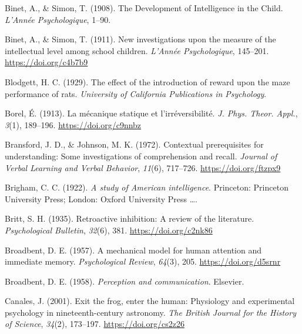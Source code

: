 \documentclass[
  oneside,
  12pt]{crumpbook}
\newlength{\cslhangindent}
\newlength{\cslentryspacingunit} %
\newenvironment{CSLReferences}[2] %
 {%
  \setlength{\parindent}{0pt}
  \ifodd #1
  \let\oldpar\par
  \def\par{\hangindent=\cslhangindent\oldpar}
  \fi
  \setlength{\parskip}{#2\cslentryspacingunit}
 }%
 {}
\begin{document}
\begin{CSLReferences}{1}{0}
\leavevmode{}%
Binet, A., \& Simon, T. (1908). The {Development} of {Intelligence} in the {Child}. \emph{L'Année Psychologique}, 1--90.

\leavevmode{}%
Binet, A., \& Simon, T. (1911). New investigations upon the measure of the intellectual level among school children. \emph{L'Année Psychologique}, 145--201. \url{https://doi.org/c4b7b9}

\leavevmode{}%
Blodgett, H. C. (1929). The effect of the introduction of reward upon the maze performance of rats. \emph{University of California Publications in Psychology}.

\leavevmode{}%
Borel, É. (1913). La mécanique statique et l'irréversibilité. \emph{J. Phys. Theor. Appl.}, \emph{3}(1), 189--196. \url{https://doi.org/c9nnbz}

\leavevmode{}%
Bransford, J. D., \& Johnson, M. K. (1972). Contextual prerequisites for understanding: {Some} investigations of comprehension and recall. \emph{Journal of Verbal Learning and Verbal Behavior}, \emph{11}(6), 717--726. \url{https://doi.org/ftzpx9}

\leavevmode{}%
Brigham, C. C. (1922). \emph{A study of {American} intelligence}. {Princeton: Princeton University Press; London: Oxford University Press \ldots{}}.

\leavevmode{}%
Britt, S. H. (1935). Retroactive inhibition: A review of the literature. \emph{Psychological Bulletin}, \emph{32}(6), 381. \url{https://doi.org/c2nk86}

\leavevmode{}%
Broadbent, D. E. (1957). A mechanical model for human attention and immediate memory. \emph{Psychological Review}, \emph{64}(3), 205. \url{https://doi.org/d5srnr}

\leavevmode{}%
Broadbent, D. E. (1958). \emph{Perception and communication}. {Elsevier}.

\leavevmode{}%
Canales, J. (2001). Exit the frog, enter the human: Physiology and experimental psychology in nineteenth-century astronomy. \emph{The British Journal for the History of Science}, \emph{34}(2), 173--197. \url{https://doi.org/cs2z26}


\end{CSLReferences}
\end{document}
